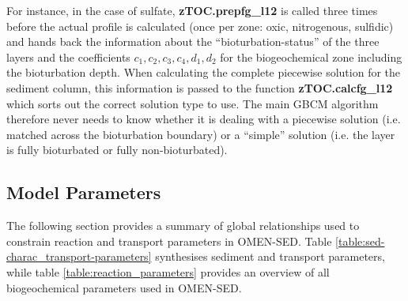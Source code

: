 \documentclass[gmd, manuscript]{copernicus}
\begin{document}
For instance, in the case of sulfate, \textsf{\textbf{zTOC.prepfg\_l12}} is called three times before the actual profile is calculated (once per zone: oxic, nitrogenous, sulfidic) 
and hands back the information about the ``bioturbation-status'' of the three layers and the coefficients $c_1, c_2, c_3, c_4, d_1, d_2$ for the biogeochemical zone including the bioturbation depth. 
When calculating the complete piecewise solution for the sediment column, this information is passed to the function \textsf{\textbf{zTOC.calcfg\_l12}} which sorts out the correct solution type to use. 
The main GBCM algorithm therefore never needs to know whether 
it is dealing with a piecewise solution (i.e. matched across the bioturbation boundary) or a ``simple'' solution (i.e. the layer is fully bioturbated or fully non-bioturbated). 


\subsection{Model Parameters}\label{subsec:ModelParameters}
The following section provides a summary of  global relationships used to constrain reaction and transport parameters in OMEN-SED. Table \ref{table:sed-charac_transport-parameters} 
synthesises sediment and transport parameters, while table \ref{table:reaction_parameters} provides an overview of all biogeochemical parameters used in OMEN-SED.
\end{document}
